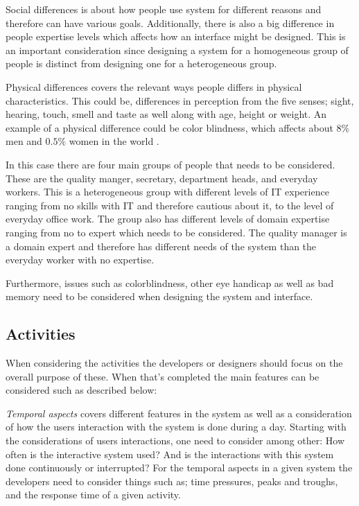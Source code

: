 Social differences is about how people use system for different reasons and therefore can have various goals. 
Additionally, there is also a big difference in people expertise levels which affects how an interface might be designed.
This is an important consideration since designing a system for a homogeneous group of people is  distinct from designing one for a heterogeneous group.

Physical differences covers the relevant ways people differs in physical characteristics.
This could be, differences in perception from the five senses; sight, hearing, touch, smell and taste as well along with age, height or weight. An example of a physical difference could be color blindness, which affects about $8\%$ men and $0.5\%$ women in the world \cite{ColourBlind}.

In this case there are four main groups of people that needs to be considered. These are the quality manger, secretary, department heads, and everyday workers. 
This is a heterogeneous group with different levels of IT experience ranging from no skills with IT and therefore cautious about it, to the level of everyday office work.
The group also has different levels of domain expertise ranging from no to expert which needs to be considered. 
The quality manager is a domain expert and therefore has different needs of the system than the everyday worker with no expertise.

Furthermore, issues such as colorblindness, other eye handicap as well as bad memory need to be considered when designing the system and interface.

\subsection{Activities}
When considering the activities the developers or designers should focus on the overall purpose of these. When that's completed the main features can be considered such as described below:

\textit{Temporal aspects} covers different features in the system as well as a consideration of how the users interaction with the system is done during a day.
Starting with the considerations of users interactions, one need to consider among other: How often is the interactive system used? And is the interactions with this system done continuously or interrupted?
For the temporal aspects in a given system the developers need to consider things such as; time pressures, peaks and troughs, and the response time of a given activity.

